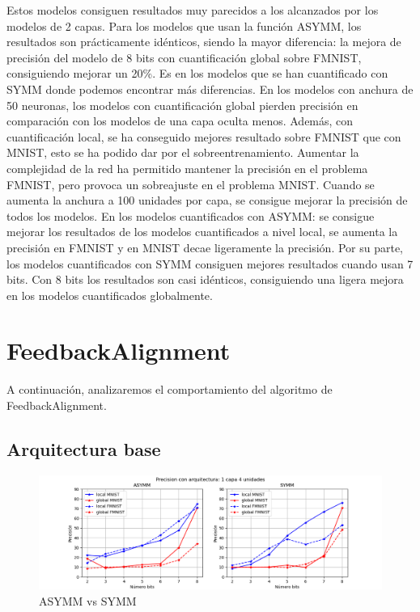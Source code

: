 Estos modelos consiguen resultados muy parecidos a los alcanzados por los modelos de 2 capas. Para los modelos que usan la función ASYMM, los resultados son prácticamente idénticos, siendo la mayor diferencia: la mejora de precisión del modelo de 8 bits con cuantificación global sobre FMNIST, consiguiendo mejorar un 20\%. Es en los modelos que se han cuantificado con SYMM donde podemos encontrar más diferencias. En los modelos con anchura de 50 neuronas, los modelos con cuantificación global pierden precisión en comparación con los modelos de una capa oculta menos. Además, con cuantificación local, se ha conseguido mejores resultado sobre FMNIST que con MNIST, esto se ha podido dar por el sobreentrenamiento. Aumentar la complejidad de la red ha permitido mantener la precisión en el problema FMNIST, pero provoca un sobreajuste en el problema MNIST. Cuando se aumenta la anchura a 100 unidades por capa, se consigue mejorar la precisión de todos los modelos. En los modelos cuantificados con ASYMM: se consigue mejorar los resultados de los modelos cuantificados a nivel local, se aumenta la precisión en FMNIST y en MNIST decae ligeramente la precisión. Por su parte, los modelos cuantificados con SYMM consiguen mejores resultados cuando usan 7 bits. Con 8 bits los resultados son casi idénticos, consiguiendo una ligera mejora en los modelos cuantificados globalmente.

\newpage

\section{FeedbackAlignment}

A continuación, analizaremos el comportamiento del algoritmo de FeedbackAlignment.

\subsection{Arquitectura base}

\begin{figure}[H]
    \centering
    \includegraphics[width=\textwidth]{imagenes/fa/Precision con arquitectura: 1 capa 4 unidades.png}
    \caption{ASYMM vs SYMM}
\end{figure}


